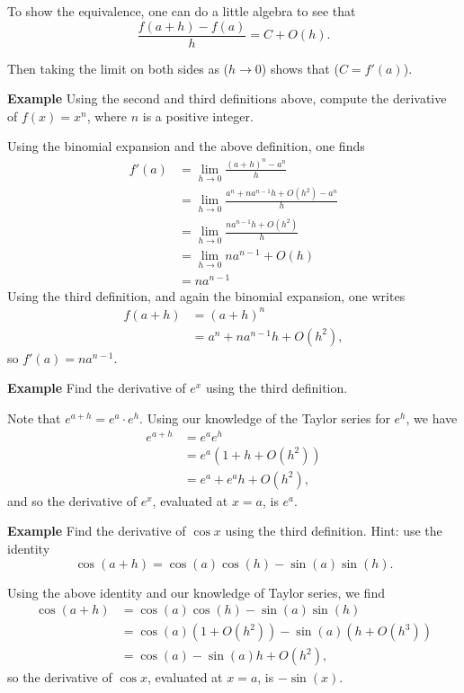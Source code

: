 \documentclass[twoside,openright,titlepage,a4paper]{book}
\begin{document}
\begin{sloppypar}
To show the equivalence, one can do a little algebra to see that \[ \frac{f(a+h) - f(a)}{h} = C + O(h). \]

Then taking the limit on both sides as ($h \rightarrow 0$) shows that ($C = f'(a)$).

\textbf{Example} Using the second and third definitions above, compute the derivative of $f(x) = x^n$, where $n$ is a positive integer. 
\begin{examplebox}
Using the binomial expansion and the above definition, one finds
\begin{align*}
f'(a) &=\lim_{h \rightarrow 0} \frac{(a+h)^n-a^n}{h} \\
&= \lim_{h \rightarrow 0} \frac{a^n +n a^{n-1}h +O(h^2) - a^n}{h} \\
&= \lim_{h \rightarrow 0} \frac{n a^{n-1} h+ O(h^2)}{h} \\
&= \lim_{h \rightarrow 0} na^{n-1} + O(h) \\
&= na^{n-1}
\end{align*}
Using the third definition, and again the binomial expansion, one writes
\begin{align*}
f(a+h) &= (a+h)^n \\
&= a^n + na^{n-1}h + O(h^2),
\end{align*}
so $f'(a) = na^{n-1}$.
\end{examplebox}

\textbf{Example} Find the derivative of $e^x$ using the third definition.
\begin{examplebox}
Note that $e^{a+h} = e^a \cdot e^h$. Using our knowledge of the Taylor series for $e^h$, we have
\begin{align*} 
e^{a+h} &= e^ae^h \\
&= e^a \left(1+h + O(h^2)\right) \\
&= e^a + e^ah + O(h^2),
\end{align*}
and so the derivative of $e^x$, evaluated at $x=a$, is $e^a$.
\end{examplebox}

\textbf{Example} Find the derivative of $\cos x$ using the third definition. Hint: use the identity \[ \cos (a+h) = \cos (a) \cos (h) - \sin (a) \sin (h). \] 
\begin{examplebox}
Using the above identity and our knowledge of Taylor series, we find
\begin{align*}
\cos(a+h) &= \cos(a)\cos(h) - \sin(a)\sin(h) \\
&= \cos(a) \left(1 + O(h^2)\right) - \sin(a) \left(h + O(h^3)\right) \\
&= \cos(a) - \sin(a) h + O(h^2), 
\end{align*}
so the derivative of $\cos x$, evaluated at $x=a$, is $-\sin(x)$.
\end{examplebox}


\end{sloppypar}
\end{document}
